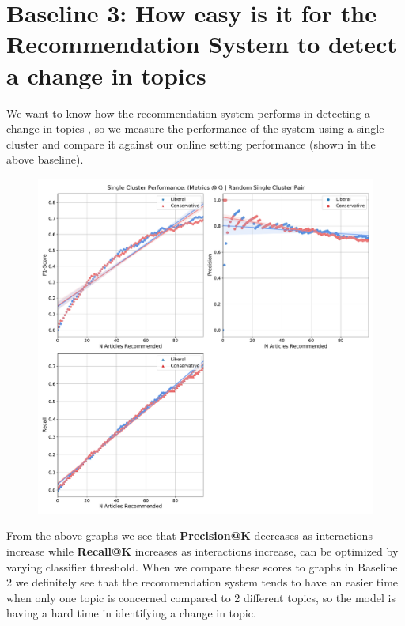 \documentclass[a4paper,fontsize=9.0pt]{scrartcl}
\begin{document}
\section{Baseline 3: How easy is it for the Recommendation System to detect a change in topics}
\begin{flushleft}
We want to know how the recommendation system performs in detecting a change in topics , so we measure the performance of the system using a single cluster and compare it against our online setting performance (shown in the above baseline). 
\end{flushleft}
\begin{figure}[H]
 \centering
 \includegraphics[scale=0.4]{Graphs/user_interaction_vs_model_performance_single_cluster.pdf}
\end{figure}
\begin{flushleft}
From the above graphs we see that \textbf{Precision@K} decreases as interactions increase while \textbf{Recall@K} increases as interactions increase, can be optimized by varying classifier threshold. When we compare these scores to graphs in Baseline 2 we definitely see that the recommendation system tends to have an easier time when only one topic is concerned compared to 2 different topics, so the model is having a hard time in identifying a change in topic.
\end{flushleft}
\end{document}
